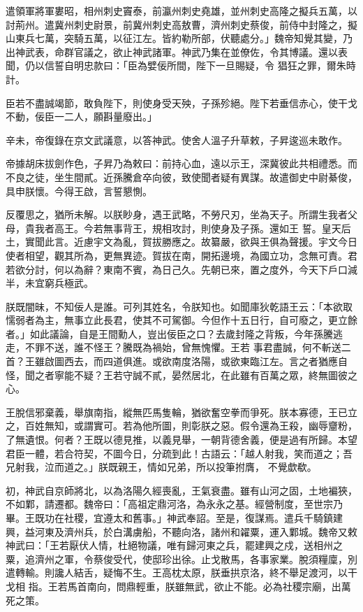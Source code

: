 \begin{pinyinscope}
 遣領軍將軍婁昭，相州刺史竇泰，前瀛州刺史堯雄，並州刺史高隆之擬兵五萬，以討荊州。遣冀州刺史尉景，前冀州刺史高敖曹，濟州刺史蔡俊，前侍中封隆之，擬山東兵七萬，突騎五萬，以征江左。皆約勒所部，伏聽處分。」魏帝知覺其變，乃出神武表，命群官議之，欲止神武諸軍。神武乃集在並僚佐，令其博議。還以表聞，仍以信誓自明忠款曰：「臣為嬖佞所間，陛下一旦賜疑，令
 猖狂之罪，爾朱時計。



 臣若不盡誠竭節，敢負陛下，則使身受天殃，子孫殄絕。陛下若垂信赤心，使干戈不動，佞臣一二人，願斟量廢出。」



 辛未，帝復錄在京文武議意，以答神武。使舍人溫子升草敕，子昇逡巡未敢作。



 帝據胡床拔劍作色，子昇乃為敕曰：前持心血，遠以示王，深冀彼此共相禮悉。而不良之徒，坐生間貳。近孫騰倉卒向彼，致使聞者疑有異謀。故遣御史中尉綦俊，具申朕懷。今得王啟，言誓懇惻。



 反覆思之，猶所未解。以朕眇身，遇王武略，不勞尺刃，坐為天子。所謂生我者父母，貴我者高王。今若無事背王，規相攻討，則使身及子孫。還如王
 誓。皇天后土，實聞此言。近慮宇文為亂，賀拔勝應之。故纂嚴，欲與王俱為聲援。宇文今日使者相望，觀其所為，更無異迹。賀拔在南，開拓邊境，為國立功，念無可責。君若欲分討，何以為辭？東南不賓，為日己久。先朝已來，置之度外，今天下戶口減半，未宜窮兵極武。



 朕既闇昧，不知佞人是誰。可列其姓名，令朕知也。如聞庫狄乾語王云：「本欲取懦弱者為主，無事立此長君，使其不可駕御。今但作十五日行，自可廢之，更立餘者。」如此議論，自是王間勳人，豈出佞臣之口？去歲封隆之背叛，今年孫騰逃走，不罪不送，誰不怪王？騰既為禍始，曾無愧懼。王若
 事君盡誠，何不斬送二首？王雖啟圖西去，而四道俱進。或欲南度洛陽，或欲東臨江左。言之者猶應自怪，聞之者寧能不疑？王若守誠不貳，晏然居北，在此雖有百萬之眾，終無圖彼之心。



 王脫信邪棄義，舉旗南指，縱無匹馬隻輪，猶欲奮空拳而爭死。朕本寡德，王已立之，百姓無知，或謂實可。若為他所圖，則彰朕之惡。假令還為王殺，幽辱齏粉，了無遺恨。何者？王既以德見推，以義見舉，一朝背德舍義，便是過有所歸。本望君臣一體，若合符契，不圖今日，分疏到此！古語云：「越人射我，笑而道之；吾兄射我，泣而道之。」朕既親王，情如兄弟，所以投筆拊膺，
 不覺歔欷。



 初，神武自京師將北，以為洛陽久經喪亂，王氣衰盡。雖有山河之固，土地褊狹，不如鄴，請遷都。魏帝曰：「高祖定鼎河洛，為永永之基。經營制度，至世宗乃畢。王既功在社稷，宜遵太和舊事。」神武奉詔。至是，復謀焉。遣兵千騎鎮建興，益河東及濟州兵，於白溝虜船，不聽向洛，諸州和糴粟，運入鄴城。魏帝又敕神武曰：「王若厭伏人情，杜絕物議，唯有歸河東之兵，罷建興之戍，送相州之粟，追濟州之軍，令蔡俊受代，使邸珍出徐。止戈散馬，各事家業。脫須糧廩，別遣轉輸。則讒人結舌，疑悔不生。王高枕太原，朕垂拱京洛，終不舉足渡河，以干戈相
 指。王若馬首南向，問鼎輕重，朕雖無武，欲止不能。必為社稷宗廟，出萬死之策。




\end{pinyinscope}
